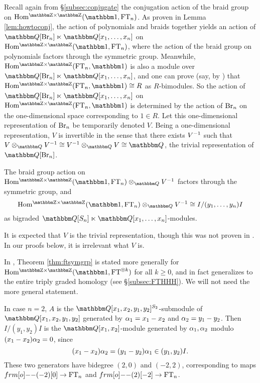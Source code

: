 Recall again from \S\ref{subsec:conjugate} the conjugation action of the braid group on $\Homgg(\one, \FT_n)$. As proven in Lemma \ref{lem:howtoconj}, the action of
polynomials and braids together yields an action of $\Q[\Br_n]\ltimes \Q[x_1,\ldots,x_n]$ on $\Homgg(\one,\FT_n)$, where the action of the braid group on polynomials factors through the symmetric group. Meanwhile, $\Homgg(\FT_n,\one)$ is also a module over $\Q[\Br_n]\ltimes \Q[x_1,\ldots,x_n]$, and one can prove (say, by \cite{LibWil}) that $\Homgg(\FT_n,\one) \cong R$ as $R$-bimodules. So the action of $\Q[\Br_n] \ltimes \Q[x_1, \ldots, x_n]$ on $\Homgg(\FT_n,\one)$ is determined by the action of $\operatorname{Br}_n$ on the one-dimensional space corresponding to $1 \in R$. Let this one-dimensional representation of $\operatorname{Br}_n$ be temporarily denoted $V$. Being a one-dimensional representation, $V$ is invertible in the sense that there exists $V^{-1}$ such that $V\otimes_\Q V\inv \cong V\inv\otimes_\Q V\cong \Q$, the trivial representation of $\Q[\Br_n]$.

\begin{theorem}\label{thm:ftsymgrp}
The braid group action on $\Homgg(\one,\FT_n) \ot_\Q V\inv$ factors through the symmetric group, and
 \[
 \Homgg(\one,\FT_n) \ot_\Q V\inv \cong I / (y_1,\ldots,y_n)I
 \]
as bigraded $\Q[S_n]\ltimes \Q[x_1,\ldots,x_n]$-modules.
\end{theorem}

\begin{remark} It is expected that $V$ is the trivial representation, though this was not proven in \cite{GorHog17}. In our proofs below, it is irrelevant what $V$ is.   \end{remark}


\begin{remark}
In \cite{GorHog17}, Theorem \ref{thm:ftsymgrp} is stated more generally for $\Homgg(\one,\FT^{\otimes k})$ for all $k\geq 0$, and in fact generalizes to the entire triply graded homology (see \S \ref{subsec:FTHHH}).  We will not need the more general statement.
\end{remark}


\begin{example}
In case $n=2$, $A$ is the $\Q[x_1,x_2,y_1,y_2]^{S_2}$-submodule of $\Q[x_1,x_2,y_1,y_2]$ generated by $\alpha_1 = x_1-x_2$ and $\alpha_2 = y_1-y_2$.  Then $I/(y_1,y_2)I$ is the $\Q[x_1,x_2]$-module generated by $\alpha_1,\alpha_2$ modulo $(x_1-x_2)\alpha_2 = 0$, since \[ (x_1 - x_2) \alpha_2 = (y_1 - y_2) \alpha_1 \in (y_1,y_2)I.\] These two generators have bidegree $(2,0)$ and $(-2,2)$, corresponding to maps $\one(-2)[0] \to \FT_n$ and $\one(2)[-2] \to \FT_n$.
\end{example}

